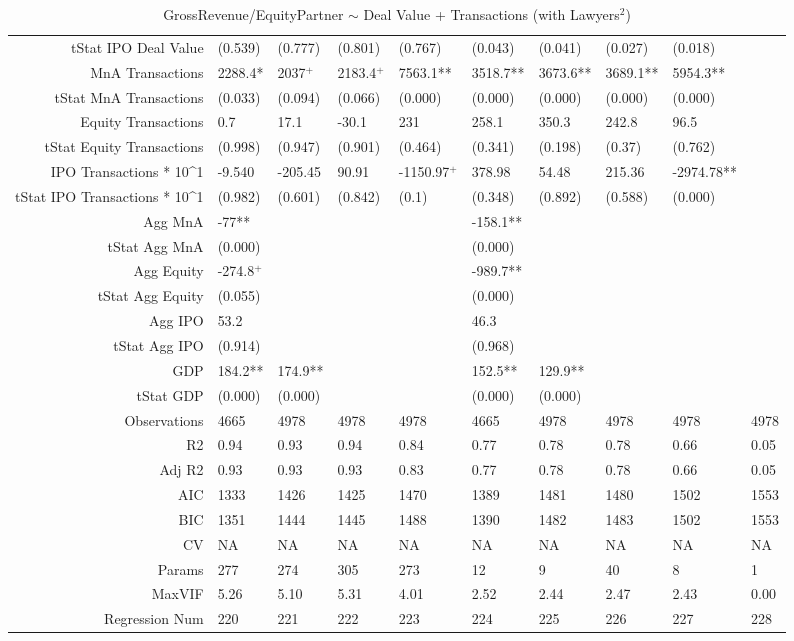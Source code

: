 \begin{table}[ht]
\begin{tabular}{rlllllllll}
  tStat IPO Deal Value & (0.539) & (0.777) & (0.801) & (0.767) & (0.043) & (0.041) & (0.027) & (0.018) &  \\ 
  MnA Transactions & 2288.4* & 2037$^{+}$ & 2183.4$^{+}$ & 7563.1** & 3518.7** & 3673.6** & 3689.1** & 5954.3** &  \\ 
  tStat MnA Transactions & (0.033) & (0.094) & (0.066) & (0.000) & (0.000) & (0.000) & (0.000) & (0.000) &  \\ 
  Equity Transactions & 0.7 & 17.1 & -30.1 & 231 & 258.1 & 350.3 & 242.8 & 96.5 &  \\ 
  tStat Equity Transactions & (0.998) & (0.947) & (0.901) & (0.464) & (0.341) & (0.198) & (0.37) & (0.762) &  \\ 
  IPO Transactions * 10^1 & -9.540 & -205.45 & 90.91 & -1150.97$^{+}$ & 378.98 & 54.48 & 215.36 & -2974.78** &  \\ 
  tStat IPO Transactions * 10^1 & (0.982) & (0.601) & (0.842) & (0.1) & (0.348) & (0.892) & (0.588) & (0.000) &  \\ 
  Agg MnA & -77** &  &  &  & -158.1** &  &  &  &  \\ 
  tStat Agg MnA & (0.000) &  &  &  & (0.000) &  &  &  &  \\ 
  Agg Equity & -274.8$^{+}$ &  &  &  & -989.7** &  &  &  &  \\ 
  tStat Agg Equity & (0.055) &  &  &  & (0.000) &  &  &  &  \\ 
  Agg IPO & 53.2 &  &  &  & 46.3 &  &  &  &  \\ 
  tStat Agg IPO & (0.914) &  &  &  & (0.968) &  &  &  &  \\ 
  GDP & 184.2** & 174.9** &  &  & 152.5** & 129.9** &  &  &  \\ 
  tStat GDP & (0.000) & (0.000) &  &  & (0.000) & (0.000) &  &  &  \\ 
  Observations & 4665 & 4978 & 4978 & 4978 & 4665 & 4978 & 4978 & 4978 & 4978 \\ 
  R2 & 0.94 & 0.93 & 0.94 & 0.84 & 0.77 & 0.78 & 0.78 & 0.66 & 0.05 \\ 
  Adj R2 & 0.93 & 0.93 & 0.93 & 0.83 & 0.77 & 0.78 & 0.78 & 0.66 & 0.05 \\ 
  AIC & 1333 & 1426 & 1425 & 1470 & 1389 & 1481 & 1480 & 1502 & 1553 \\ 
  BIC & 1351 & 1444 & 1445 & 1488 & 1390 & 1482 & 1483 & 1502 & 1553 \\ 
  CV & NA & NA & NA & NA & NA & NA & NA & NA & NA \\ 
  Params & 277 & 274 & 305 & 273 & 12 & 9 & 40 & 8 & 1 \\ 
  MaxVIF & 5.26 & 5.10 & 5.31 & 4.01 & 2.52 & 2.44 & 2.47 & 2.43 & 0.00 \\ 
  Regression Num & 220 & 221 & 222 & 223 & 224 & 225 & 226 & 227 & 228 \\ 
   \hline
\end{tabular}
\caption{GrossRevenue/EquityPartner $\sim$ Deal Value + Transactions (with Lawyers$^2$)} 
\end{table}
